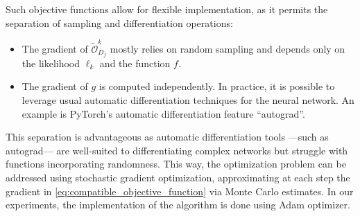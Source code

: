 Such objective functions
allow for flexible implementation, as it permits the separation of sampling and differentiation operations:
\begin{itemize}
    \item The gradient of $\tilde{\mathcal{O}}^k_{D_f}$ mostly relies on random sampling and depends only on the likelihood $\ell_k$ and the function $f$. %

    \item The gradient of $g$ is
    computed independently. In practice, 
    it is possible to leverage usual automatic differentiation techniques for the neural network. An example is  PyTorch's automatic differentiation feature ``autograd''.
\end{itemize}
This separation is advantageous as  automatic differentiation tools ---such as autograd--- are well-suited to differentiating complex networks but struggle with functions incorporating randomness. 
This way, the optimization problem can be addressed using stochastic gradient optimization, approximating at each step the gradient in \cref{eq:compatible_objective_function} via Monte Carlo estimates.
In our experiments, the implementation of the algorithm is done using Adam optimizer. %


